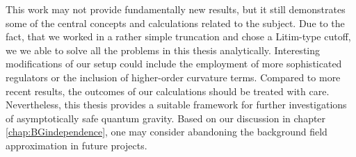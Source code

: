 This work may not provide fundamentally new results, but it still demonstrates some of the central concepts and calculations related to the subject. Due to the fact, that we worked in a rather simple truncation and chose a Litim-type cutoff, we we able to solve all the problems in this thesis analytically. Interesting modifications of our setup could include the employment of more sophisticated regulators or the inclusion of higher-order curvature terms. Compared to more recent results, the outcomes of our calculations should be treated with care. Nevertheless, this thesis provides a suitable framework for further investigations of asymptotically safe quantum gravity. Based on our discussion in chapter \ref{chap:BGindependence}, one may consider abandoning the background field approximation in future projects. 